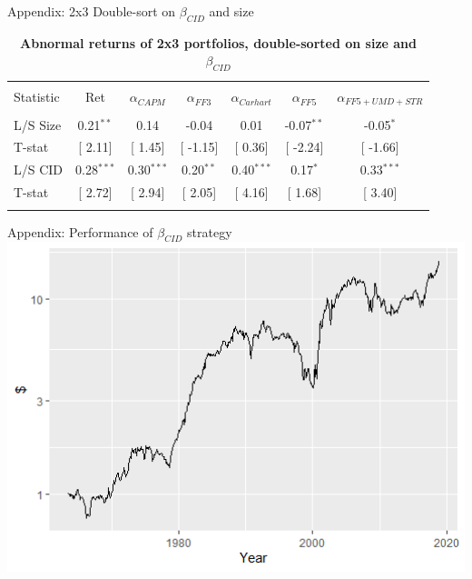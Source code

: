 \documentclass{beamer}
\begin{document}
\begin{frame}{Appendix: 2x3 Double-sort on $\beta_{CID}$ and size}
\begin{table}[!htbp] \centering 
  \caption{\textbf{Abnormal returns of 2x3 portfolios, double-sorted on size and $\beta_{CID}$}}
  \label{} 
\begin{tabular}{@{\extracolsep{5pt}} lcccccc} 
\\[-1.8ex]\hline 
\hline \\[-1.8ex] 
Statistic & Ret & $\alpha_{CAPM}$ & $\alpha_{FF3}$ & $\alpha_{Carhart}$ & $\alpha_{FF5}$ & $\alpha_{FF5+UMD+STR}$ \\ 
\hline \\[-1.8ex] 
L/S Size & 0.21$^{**}$ & 0.14 & -0.04 & 0.01 & -0.07$^{**}$ & -0.05$^{*}$ \\ 
T-stat & [ 2.11] & [ 1.45] & [ -1.15] & [ 0.36] & [ -2.24] & [ -1.66] \\ 
L/S CID & 0.28$^{***}$ & 0.30$^{***}$ & 0.20$^{**}$ & 0.40$^{***}$ & 0.17$^{*}$ & 0.33$^{***}$ \\ 
T-stat & [ 2.72] & [ 2.94] & [ 2.05] & [ 4.16] & [ 1.68] & [ 3.40] \\
\hline \\[-1.8ex] 
\end{tabular}
\end{table}
\end{frame}



\begin{frame}{Appendix: Performance of $\beta_{CID}$ strategy}
\includegraphics[width=1\textwidth]{Figure2_sl.png}    
\end{frame}
\end{document}
